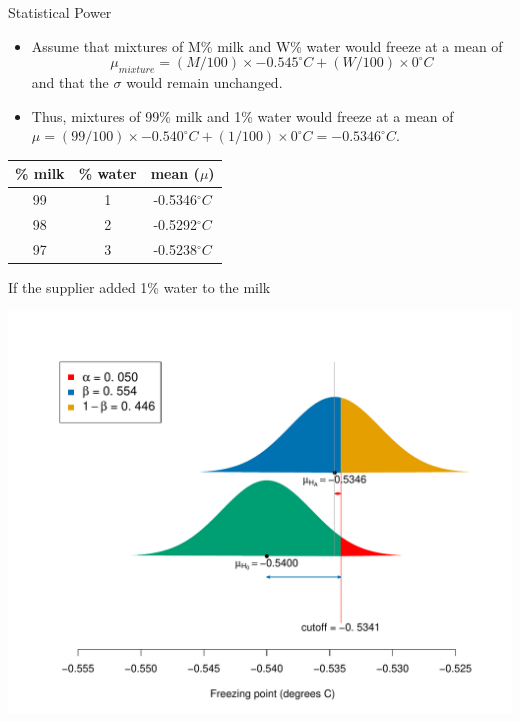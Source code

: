 \documentclass[handout]{beamer}\usepackage[]{graphicx}\usepackage[]{color}
\newenvironment{knitrout}{}{} %
\begin{document}
\begin{frame}{Statistical Power}
\small
\begin{itemize}
	\setlength\itemsep{1em}
	\item Assume that  mixtures of M\% milk and W\% water  would freeze at a mean of $$\mu_{mixture} =  (M/100) \times -0.545^{\circ}C + (W/100) \times 0 ^{\circ}C$$ and that the $\sigma$ would remain unchanged. \pause 
	\item Thus, mixtures of 99\% milk and 1\% water  would freeze at a mean of $\mu =  (99/100) \times -0.540^{\circ}C + (1/100) \times 0 ^{\circ}C = -0.5346 ^{\circ} C.$ 
	\end{itemize}

\begin{center}
	\begin{tabular}{|c|c|c|}
		\hline 
		\% milk & \% water & mean ($\mu$) \\ 
		\hline 
		99 & 1 & -0.5346$^{\circ}C$ \\ 
		98 & 2 & -0.5292$^{\circ}C$ \\ 
		97 & 3 & -0.5238$^{\circ}C$ \\ 
		\hline 
	\end{tabular} 
\end{center}
\end{frame}


\begin{frame}[fragile]{If the supplier added 1\% water to the milk}
\begin{knitrout}\scriptsize
{}\color{fgcolor}

{\centering \includegraphics[width=1\linewidth]{figure/unnamed-chunk-7-1} 

}



\end{knitrout}
\end{frame}
\end{document}
